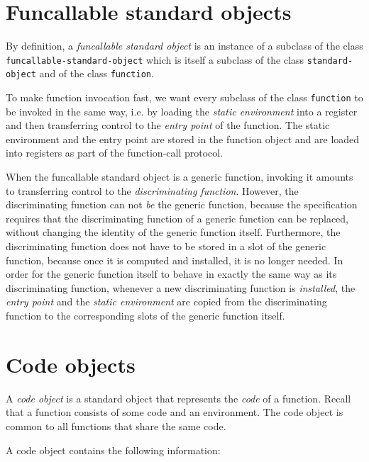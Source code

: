 \section{Funcallable standard objects}
\label{sec-data-representation-funcallable-standard-objects}

By definition, a \emph{funcallable standard object} is an instance of
a subclass of the class \texttt{funcallable-standard-object} which is
itself a subclass of the class \texttt{standard-object} and of the
class \texttt{function}. 

To make function invocation fast, we want every subclass of the class
\texttt{function} to be invoked in the same way, i.e. by loading the
\emph{static environment} into a register and then transferring
control to the \emph{entry point} of the function. The static
environment and the entry point are stored in the function object
and are loaded into registers as part of the function-call protocol.

When the funcallable standard object is a generic function, invoking
it amounts to transferring control to the \emph{discriminating
  function}.  However, the discriminating function can not \emph{be}
the generic function, because the \clos{} specification requires that
the discriminating function of a generic function can be replaced,
without changing the identity of the generic function itself.
Furthermore, the discriminating function does not have to be stored in
a slot of the generic function, because once it is computed and
installed, it is no longer needed.  In order for the generic function
itself to behave in exactly the same way as its discriminating
function, whenever a new discriminating function is \emph{installed},
the \emph{entry point} and the \emph{static environment} are copied
from the discriminating function to the corresponding slots of the
generic function itself.

\section{Code objects}
\label{data-representation-code-objects}

A \emph{code object} is a standard object that represents the
\emph{code} of a function.  Recall that a function consists of some
code and an environment.  The code object is common to all functions
that share the same code.

A code object contains the following information:

